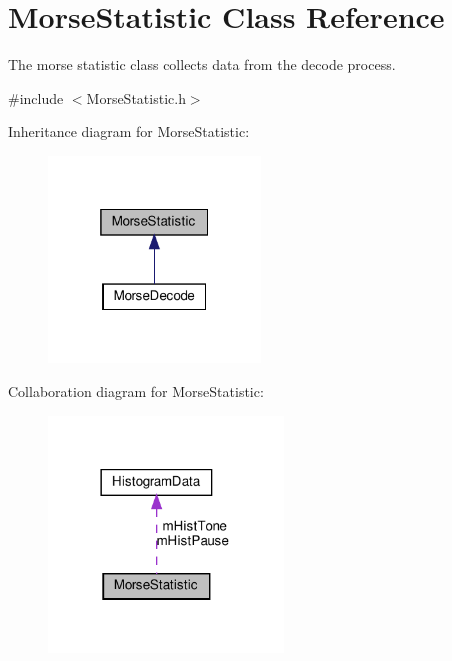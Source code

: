 \hypertarget{classMorseStatistic}{}\section{Morse\+Statistic Class Reference}
\label{classMorseStatistic}


The morse statistic class collects data from the decode process.  




{\ttfamily \#include $<$Morse\+Statistic.\+h$>$}



Inheritance diagram for Morse\+Statistic\+:\nopagebreak
\begin{figure}[H]
\begin{center}
\leavevmode
\includegraphics[width=160pt]{classMorseStatistic__inherit__graph}
\end{center}
\end{figure}


Collaboration diagram for Morse\+Statistic\+:\nopagebreak
\begin{figure}[H]
\begin{center}
\leavevmode
\includegraphics[width=177pt]{classMorseStatistic__coll__graph}
\end{center}
\end{figure}
